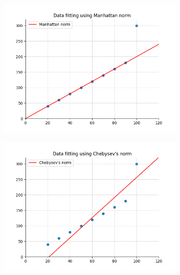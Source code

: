 \documentclass[report.tex]{subfiles}
\begin{document}
\begin{figure}[h!]
	\centering
	\begin{subfigure}[b]{0.48\linewidth}
		\includegraphics[width=\linewidth]{figs/L1_linear_with_outlier.png}
	\end{subfigure}
	\begin{subfigure}[b]{0.48\linewidth}
	\includegraphics[width=\linewidth]{figs/LInf_linear_with_outlier.png}
	\end{subfigure}
	\begin{subfigure}[b]{0.48\linewidth}

\end{subfigure}
\end{figure}
\end{document}
